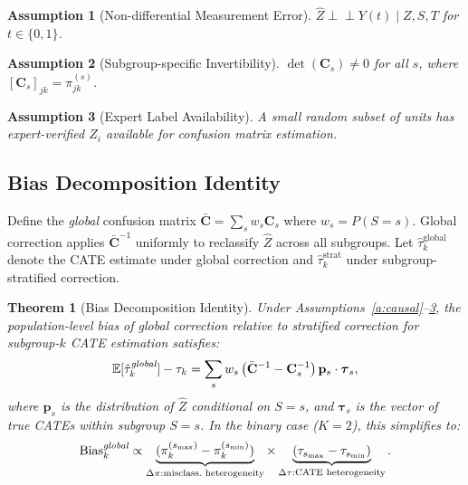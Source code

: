 \documentclass[11pt,a4paper]{article}
\newtheorem{theorem}{Theorem}
\newtheorem{assumption}{Assumption}
\newcommand{\E}{\mathbb{E}}
\begin{document}
\begin{assumption}[Non-differential Measurement Error]\label{a:nondiff}
$\hat{Z} \perp\!\!\!\perp Y(t) \mid Z, S, T$ for $t \in \{0,1\}$.
\end{assumption}

\begin{assumption}[Subgroup-specific Invertibility]\label{a:invert}
$\det(\mathbf{C}_s) \neq 0$ for all $s$, where $[\mathbf{C}_s]_{jk} = \pi_{jk}^{(s)}$.
\end{assumption}

\begin{assumption}[Expert Label Availability]\label{a:expert}
A small random subset of units has expert-verified $Z_i$ available for confusion matrix estimation.
\end{assumption}

\subsection{Bias Decomposition Identity}

Define the \emph{global} confusion matrix $\bar{\mathbf{C}} = \sum_s w_s \mathbf{C}_s$ where $w_s = P(S=s)$.
Global correction applies $\bar{\mathbf{C}}^{-1}$ uniformly to reclassify $\hat{Z}$ across all subgroups.
Let $\hat{\tau}_k^{\text{global}}$ denote the CATE estimate under global correction and $\hat{\tau}_k^{\text{strat}}$ under subgroup-stratified correction.

\begin{theorem}[Bias Decomposition Identity]\label{thm:bias_decomposition}
Under Assumptions~\ref{a:causal}--\ref{a:expert}, the population-level bias of global correction relative to stratified correction for subgroup-$k$ CATE estimation satisfies:
\begin{equation}
\E[\hat{\tau}_k^{\emph{global}}] - \tau_k = \sum_{s} w_s \left(\bar{\mathbf{C}}^{-1} - \mathbf{C}_s^{-1}\right) \mathbf{p}_s \cdot \boldsymbol{\tau}_s,
\end{equation}
where $\mathbf{p}_s$ is the distribution of $\hat{Z}$ conditional on $S=s$, and $\boldsymbol{\tau}_s$ is the vector of true CATEs within subgroup $S=s$.
In the binary case ($K=2$), this simplifies to:
\begin{equation}\label{eq:product_form}
\text{Bias}_k^{\emph{global}} \propto \underbrace{(\pi_k^{(s_{\max})} - \pi_k^{(s_{\min})})}_{\Delta\pi: \text{misclass.\ heterogeneity}} \times \underbrace{(\tau_{s_{\max}} - \tau_{s_{\min}})}_{\Delta\tau: \text{CATE heterogeneity}}.
\end{equation}
\end{theorem}
\end{document}
